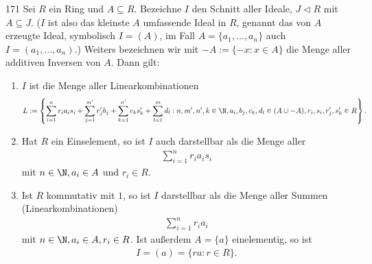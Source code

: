 \begin{algebraUE}{171}
Sei $R$ ein Ring und $A \subseteq R$. Bezeichne $I$ den Schnitt aller Ideale,
$J \vartriangleleft R$ mit $A \subseteq J$. ($I$ ist also das kleinste $A$ umfassende
Ideal in $R$, genannt das von $A$ erzeugte Ideal, symbolisch $I = (A)$, im Fall
$A = \{a_1,\dots,a_n\}$ auch $I = (a_1,\dots,a_n)$.)
Weiters bezeichnen wir mit $-A := \{-x: x \in A\}$ die Menge aller additiven Inversen von $A$.
Dann gilt:
\begin{enumerate}[label = (\arabic*)]
  \item $I$ ist die Menge aller Linearkombinationen
  \begin{align}\label{lk}
    L := \left\{\sum_{i = 1}^n r_ia_is_i + \sum_{j = 1}^{m^{\prime}}r_j^{\prime}b_j +
    \sum_{k = 1}^{n^{\prime}}c_ks_k^{\prime} + \sum_{l = 1}^{m}d_l :
    n,m^{\prime}, n^{\prime}, k \in \N, a_i, b_j, c_k, d_l \in (A \cup -A),
    r_i, s_i, r_j^{\prime}, s_k^{\prime} \in R \right\}.
  \end{align}
  \item Hat $R$ ein Einselement, so ist $I$ auch darstellbar als die Menge aller
  \begin{align*}
    \sum_{i = 1}^n r_ia_is_i
  \end{align*}
  mit $n \in \N, a_i \in A$ und $r_i \in R$.
  \item Ist $R$ kommutativ mit $1$, so ist $I$ darstellbar als die Menge aller
  Summen (Linearkombinationen)
  \begin{align*}
    \sum_{i=1}^n r_ia_i
  \end{align*}
  mit $n \in \N, a_i \in A, r_i \in R$. Ist außerdem $A = \{a\}$ einelementig, so ist
  \begin{align*}
    I = (a) = \{ra: r \in R\}.
  \end{align*}
\end{enumerate}
\end{algebraUE}
